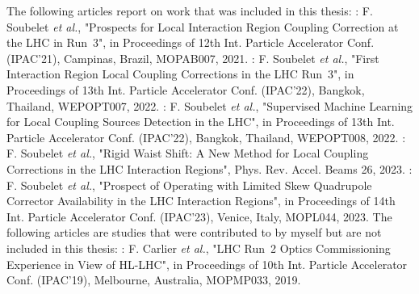 \begin{declaration}
The following articles report on work that was included in this thesis:
\newline \newline
\noindent\cite{IPAC:Soubelet:Prospect_IR_Coupling_Correction_LHC_Run3}: F. Soubelet \textit{et al.}, "Prospects for Local Interaction Region Coupling Correction at the LHC in Run~\num{3}", in Proceedings of \num{12}th Int. Particle Accelerator Conf. (IPAC'21), Campinas, Brazil, MOPAB007, \num{2021}.
\newline \newline
\noindent\cite{IPAC:Soubelet:First_Corrections_IR_Local_Coupling_LHC_Run3}: F. Soubelet \textit{et al.}, "First Interaction Region Local Coupling Corrections in the LHC Run~\num{3}", in Proceedings of \num{13}th Int. Particle Accelerator Conf. (IPAC'22), Bangkok, Thailand, WEPOPT007, \num{2022}.
\newline \newline
\noindent\cite{IPAC:Soubelet:Supervised_Machine_Learning_Local_Coupling_Sources_Detection_LHC}: F. Soubelet \textit{et al.}, "Supervised Machine Learning for Local Coupling Sources Detection in the LHC", in Proceedings of \num{13}th Int. Particle Accelerator Conf. (IPAC'22), Bangkok, Thailand, WEPOPT008, \num{2022}.
\newline \newline
\noindent\cite{PRAB:Soubelet:Rigid_Waist_Shift_Method_Local_Coupling_Correction_LHC_IR}: F. Soubelet \textit{et al.}, "Rigid Waist Shift: A New Method for Local Coupling Corrections in the LHC Interaction Regions", Phys. Rev. Accel. Beams \num{26}, \num{2023}.
\newline \newline
\noindent\cite{IPAC:Soubelet:Prospect_Operating_Limited_Skew_Quadrupole_Corrector_Availability_LHC_IR}: F. Soubelet \textit{et al.}, "Prospect of Operating with Limited Skew Quadrupole Corrector Availability in the LHC Interaction Regions", in Proceedings of \num{14}th Int. Particle Accelerator Conf. (IPAC'23), Venice, Italy, MOPL044, \num{2023}.
\newline
\newline
\indent
The following articles are studies that were contributed to by myself but are not included in this thesis:
\newline \newline
\noindent\cite{IPAC:Tomas:Run2_Experience_View_LHC_HLLHC}: F. Carlier \textit{et al.}, "LHC Run~\num{2} Optics Commissioning Experience in View of HL-LHC", in Proceedings of \num{10}th Int. Particle Accelerator Conf. (IPAC'19), Melbourne, Australia, MOPMP033, \num{2019}.

\end{declaration}
